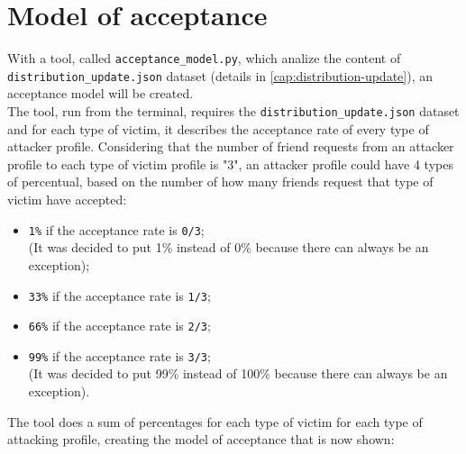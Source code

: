 \section{Model of acceptance}
\label{cap:model-of-acceptance}
With a tool, called \texttt{acceptance\_model.py}, which analize the content of \\ \texttt{distribution\_update.json} dataset (details in \ref{cap:distribution-update}), an acceptance model will be created.\\
The tool, run from the terminal, requires the \texttt{distribution\_update.json} dataset and for each type of victim, it describes the acceptance rate of every type of attacker profile. Considering that the number of friend requests from an attacker profile to each type of victim profile is "3", an attacker profile could have 4 types of percentual, based on the number of how many friends request that type of victim have accepted:
\begin{itemize}
	\item \texttt{1\%} if the acceptance rate is \texttt{0/3}; \\(It was decided to put 1\% instead of 0\% because there can always be an exception);
	\item \texttt{33\%} if the acceptance rate is \texttt{1/3};
	\item \texttt{66\%} if the acceptance rate is \texttt{2/3};
	\item \texttt{99\%} if the acceptance rate is \texttt{3/3};	\\(It was decided to put 99\% instead of 100\% because there can always be an exception).
\end{itemize}
The tool does a sum of percentages for each type of victim for each type of attacking profile, creating the model of acceptance that is now shown:
